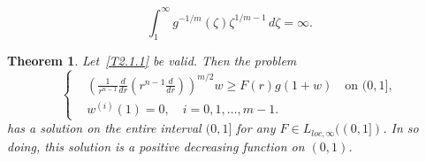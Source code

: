 \documentclass[10pt,a4paper]{amsart}
\newtheorem{theorem}{Theorem}
\begin{document}
\begin{equation}
	\int_1^\infty
	g^{- 1 / m} (\zeta)
	\zeta^{1 / m - 1}
	\,
	d\zeta
	=
	\infty.
	\label{T2.1.1}
\end{equation}

\begin{theorem}\label{T2.2}
Let~\eqref{T2.1.1} be valid. Then the problem
\begin{equation}
	\left\{
		\begin{aligned}
			&
			\left(
				\frac{
					1
				}{
					r^{n-1}
				}
				\frac{d}{dr}
				\left(
					r^{n-1}
					\frac{d}{dr}
				\right)
			\right)^{m/2}
			w
			\ge
			F (r)
			g (1 + w)
			\quad
			\mbox{on } (0, 1],
			\\
			&
			w^{(i)} (1) = 0,
			\quad
			i = 0, 1, \ldots, m - 1.
		\end{aligned}
	\right.
	\label{T2.2.1}		
\end{equation}
has a solution on the entire interval $(0, 1]$ for any $F \in L_{loc, \infty} ((0, 1])$.
In so doing, this solution is a positive decreasing function on $(0, 1)$.
\end{theorem}
\end{document}

